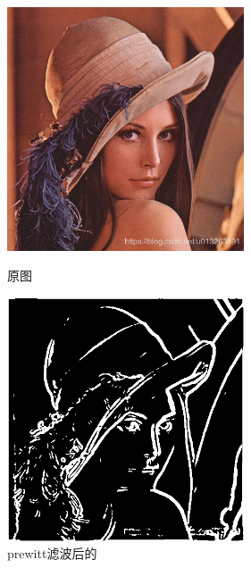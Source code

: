\documentclass[11pt, a4paper, UTF8]{ctexart}
\begin{document}
\begin{figure}[H]
  \centering
  \begin{minipage}[t]{0.48\textwidth}
  \centering
  \includegraphics[width=7cm]{lena.png}
  \caption{原图}
  \end{minipage}
  \begin{minipage}[t]{0.48\textwidth}
  \centering
  \includegraphics[width=7cm]{prewitt_all_lena.png}
  \caption{prewitt滤波后的}
  \end{minipage}
\end{figure}
\end{document}
